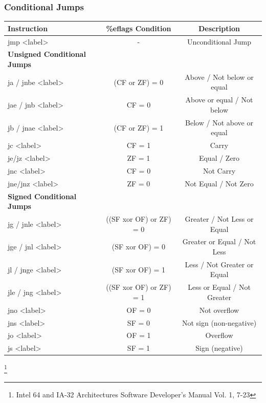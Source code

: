 \documentclass[11pt,xcolor=dvipsnames]{beamer}
\newcommand{\mvs}{\vspace{-0.95em}}
\begin{document}
\begin{frame}[fragile,t]
\frametitle{Conditional Jumps}
\mvs
\begin{table}[h]\scriptsize
\begin{tabular}{l|c|c}
  \textbf{Instruction} & \textbf{\%eflags Condition} &  \textbf{Description} \\
  \hline
  {\ttfamily jmp <label>} & - & Unconditional Jump \\
  \textbf{Unsigned Conditional Jumps} & & \\
  \hline
  {\ttfamily ja / jnbe <label>} & (CF or ZF) = 0 & Above / Not below or equal \\
  {\ttfamily jae / jnb <label>} & CF = 0 & Above or equal / Not below \\
  {\ttfamily jb / jnae <label>} & (CF or ZF) = 1 & Below / Not above or equal \\
  {\ttfamily jc <label>} & CF = 1 & Carry \\
  {\ttfamily je/jz <label>} & ZF = 1 & Equal / Zero \\
  {\ttfamily jnc <label>} & CF = 0 & Not Carry \\
  {\ttfamily jne/jnz <label>} & ZF = 0 & Not Equal / Not Zero \\
  \textbf{Signed Conditional Jumps} & & \\
  \hline
  {\ttfamily jg / jnle <label>} & ((SF xor OF) or ZF) = 0 & Greater / Not Less or Equal\\
  {\ttfamily jge / jnl <label>} & (SF xor OF) = 0 & Greater or Equal / Not Less\\
  {\ttfamily jl / jnge <label>} & (SF xor OF) = 1 & Less / Not Greater or Equal \\
  {\ttfamily jle / jng <label>} & ((SF xor OF) or ZF) = 1 & Less or Equal / Not Greater \\
  {\ttfamily jno <label>} & OF = 0 & Not overflow \\
  {\ttfamily jns <label>} & SF = 0 & Not sign (non-negative) \\
  {\ttfamily jo <label>} & OF = 1 & Overflow \\
  {\ttfamily js <label>} & SF = 1 & Sign (negative) \\
\end{tabular}
\end{table} \let\thefootnote\relax\footnote{Intel 64 and IA-32 Architectures Software Developer’s Manual Vol. 1, 7-23}
\end{frame}
\end{document}
